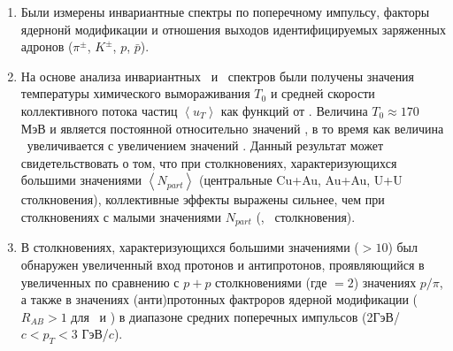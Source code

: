 \begin{enumerate}
\item Были измерены инвариантные спектры по поперечному импульсу, факторы ядернонй модификации и отношения выходов идентифицируемых заряженных адронов ($\pi^\pm$, $K^\pm$, $p$, $\bar{p}$).

\item На основе анализа инвариантных \pt \ и \mt \ спектров были получены значения температуры химического вымораживания $T_{0}$ и средней скорости коллективного потока частиц $\left< u_T \right>$ как функций от \Npart.
Величина $T_{0}\approx170$ МэВ и является постоянной относительно значений \Npart, в то время как величина \ut \ увеличивается с увеличением значений \Npart. Данный результат может свидетельствовать о том, что при столкновениях, характеризующихся большими значениями $\left<N_{part}\right>$ (центральные Cu+Au, Au+Au, U+U столкновения), коллективные эффекты выражены сильнее, чем при столкновениях с малыми значениями $N_{part}$ (\pal, \heau \ столкновения).

\item В столкновениях, характеризующихся большими значениями \Npart (\Npart$>10$) был обнаружен увеличенный вход протонов и антипротонов, проявляющийся в увеличенных по сравнению с $p+p$ столкновениями (где \Npart $=2$) значениях $p/\pi$, а также в значениях (анти)протонных фактроров ядерной модификации ($R_{AB}>1$ для \prot \ и \aprot) в диапазоне средних поперечных импульсов (2ГэВ/$c<p_T<3$ ГэВ/$c$).
\begin{comment}
В столкновениях с малыми значениями \Npart (\pal, \heau, \dau столкновениях и периферийных столкновениях Cu+Au, U+U) отношения \prot/$\pi$ близки к значениям, измеренным в \pp-столкновениях ($(p/\pi)^{р+р}$). В столкновениях с большими \Npart (центральные столкновения Cu+Au, Au+Au и U+U) отношения \prot/$\pi$ достигают значения 0.8, что в 2,5 раза больше, чем $(p/\pi)^{ р+р}$. Таким образом, в столкновениях тяжелых ионов (\cuau, \auau, \uu) отношения \prot/$\pi$ сильно зависят от центральности, а при малых \heau и \dau столкновениях зависимость от центральности незначительна в пределах неопределенности. В \pal-столкновениях зависимость от центральности отсутствует и значения \prot/$\pi$ согласуются с таковыми, измеренными в \pp-столкновениях, в пределах погрешностей.
Отношения $K/\pi$ во всех рассмотренных системах также не показывают зависимости от центральности.
Наблюдаемое поведение отношений $p/\pi$ и $K/\pi$ можно описать в рамках рекомбинационных моделей адронизации КГП.
\end{comment}


\end{enumerate}
